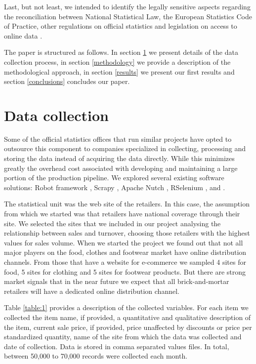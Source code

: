 \documentclass[]{article}
\begin{document}
Last, but not least, we intended to identify the legally sensitive aspects regarding the reconciliation between National Statistical Law, the European Statistics Code of Practice, other regulations on official statistics and legislation on access to online data \cite{swier}.

The paper is structured as follows. In section \ref{section2} we present details of the data collection process, in section \ref{methodology} we provide a description of the methodological approach, in section \ref{results} we present our first results and section \ref{conclusions} concludes our paper.


\section{Data collection}\label{section2}
 
Some of the official statistics offices that run similar projects have opted to outsource this component to companies specialized 
in collecting, processing and storing the data instead of acquiring the data directly. While this minimizes greatly the overhead 
cost associated with developing and maintaining a large portion of the production pipeline. We explored several existing software solutions: 
Robot framework \cite{robot2018}, Scrapy \cite{scrapy1}, \cite{scrapy2} Apache Nutch \cite{nutch}, RSelenium \cite{rs1}, and \cite{rvest}. 

The statistical unit was the web site of the retailers. In this case, the assumption from which we started was 
that retailers have national coverage through their site. We selected the sites that we included in our project analysing 
the relationship between sales and turnover, choosing those retailers with the highest values for sales volume. 
When we started the project we found out that not all major players on the food, clothes and footwear market have
online distribution channels. From those that have a website for e-commerce we sampled 4 sites for food, 
5 sites for clothing and 5 sites for footwear products. But there are strong market signals that in the near future 
we expect that all brick-and-mortar retailers will have a dedicated online distribution channel.

Table \ref{table:1} provides a description of the collected variables. For each item we collected the item name, if provided, 
a quantitative and qualitative description of the item, current sale price, if provided, price unaffected by discounts or 
price per standardized quantity, name of the site from which the data was collected and date of collection. Data is stored 
in comma separated values files. In total, between 50,000 to 70,000 records were collected each month.
\end{document}
